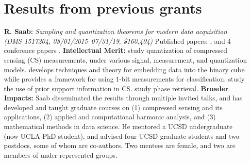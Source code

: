 
\section{Results from previous grants}
{\bf R. Saab:} {\em Sampling and quantization theorems for modern data acquisition (DMS-1517204, 08/01/2015--07/31/19,
\$160,404)}
Published papers: \cite{knudson2016one, mansour2017recovery, needell2017weighted, SaabIEEEIT, needell2018simple, LybrandSaab2018, iwen2018phase, huynh2018fast, feng2019quantized}, and 4 conference papers \cite{needell2017simple, feng2017quantized, iwen2018phase, iwen2019new}.  {\bf Intellectual Merit:}  \cite{knudson2016one, SaabIEEEIT, feng2019quantized, LybrandSaab2018, iwen2019new} study quantization of compressed sensing (CS) measurements, under various signal, measurement, and quantization models. \cite{huynh2018fast} develops techniques and theory for embedding data into the binary cube while  \cite{needell2018simple} provides a framework for using $1$-bit  measurements for classification. \cite{mansour2017recovery, needell2017weighted} study  the use of prior support information  in CS. \cite{iwen2018phase, iwen2017phase} study phase retrieval. %
{\bf Broader Impacts: }  Saab disseminated the results through multiple invited talks, and has developed and taught graduate courses on (1) compressed sensing and its applications, (2) applied and computational harmonic analysis, and (3) mathematical methods in data science. He mentored a UCSD undergraduate (now UCLA PhD student), and advised four UCSD graduate students and two postdocs,  some of whom are co-authors. Two  mentees are female, and two are members of under-represented groups.%


